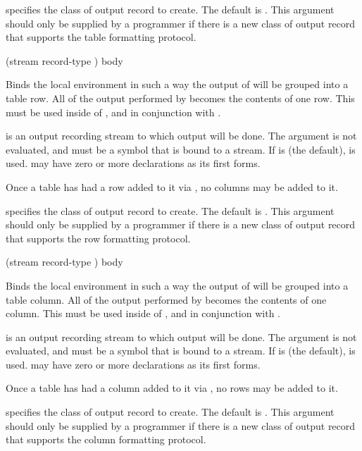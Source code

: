  specifies the class of output record to create.  The default
is .  This argument should only be supplied by
a programmer if there is a new class of output record that supports the table
formatting protocol.


 {(\optional stream \key record-type \allow)
                            \body body}

Binds the local environment in such a way the output of  will be
grouped into a table row.  All of the output performed by  becomes the
contents of one row.  This must be used inside of , and in
conjunction with .

 is an output recording stream to which output will be done.  The
 argument is not evaluated, and must be a symbol that is bound to a
stream.  If  is  (the default),  is
used.   may have zero or more declarations as its first forms.

Once a table has had a row added to it via , no columns may
be added to it.

 specifies the class of output record to create.  The default
is .  This argument should only be supplied by a
programmer if there is a new class of output record that supports the row
formatting protocol.


 {(\optional stream \key record-type \allow)
                               \body body}

Binds the local environment in such a way the output of  will be
grouped into a table column.  All of the output performed by  becomes
the contents of one column.  This must be used inside of ,
and in conjunction with .

 is an output recording stream to which output will be done.  The
 argument is not evaluated, and must be a symbol that is bound to a
stream.  If  is  (the default),  is
used.   may have zero or more declarations as its first forms.

Once a table has had a column added to it via , no rows
may be added to it.

 specifies the class of output record to create.  The default
is .  This argument should only be supplied
by a programmer if there is a new class of output record that supports the
column formatting protocol.


